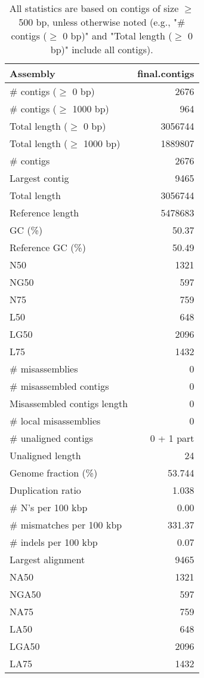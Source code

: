 \documentclass[12pt,a4paper]{article}
\begin{document}
\begin{table}[ht]
\begin{center}
\caption{All statistics are based on contigs of size $\geq$ 500 bp, unless otherwise noted (e.g., "\# contigs ($\geq$ 0 bp)" and "Total length ($\geq$ 0 bp)" include all contigs).}
\begin{tabular}{|l*{1}{|r}|}
\hline
Assembly & final.contigs \\ \hline
\# contigs ($\geq$ 0 bp) & 2676 \\ \hline
\# contigs ($\geq$ 1000 bp) & 964 \\ \hline
Total length ($\geq$ 0 bp) & 3056744 \\ \hline
Total length ($\geq$ 1000 bp) & 1889807 \\ \hline
\# contigs & 2676 \\ \hline
Largest contig & 9465 \\ \hline
Total length & 3056744 \\ \hline
Reference length & 5478683 \\ \hline
GC (\%) & 50.37 \\ \hline
Reference GC (\%) & 50.49 \\ \hline
N50 & 1321 \\ \hline
NG50 & 597 \\ \hline
N75 & 759 \\ \hline
L50 & 648 \\ \hline
LG50 & 2096 \\ \hline
L75 & 1432 \\ \hline
\# misassemblies & 0 \\ \hline
\# misassembled contigs & 0 \\ \hline
Misassembled contigs length & 0 \\ \hline
\# local misassemblies & 0 \\ \hline
\# unaligned contigs & 0 + 1 part \\ \hline
Unaligned length & 24 \\ \hline
Genome fraction (\%) & 53.744 \\ \hline
Duplication ratio & 1.038 \\ \hline
\# N's per 100 kbp & 0.00 \\ \hline
\# mismatches per 100 kbp & 331.37 \\ \hline
\# indels per 100 kbp & 0.07 \\ \hline
Largest alignment & 9465 \\ \hline
NA50 & 1321 \\ \hline
NGA50 & 597 \\ \hline
NA75 & 759 \\ \hline
LA50 & 648 \\ \hline
LGA50 & 2096 \\ \hline
LA75 & 1432 \\ \hline
\end{tabular}
\end{center}
\end{table}
\end{document}

